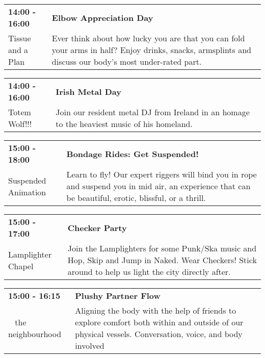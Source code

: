 \begin{tabular}{ p{1in} p{2.2in} }
    \textbf{14:00 - 16:00} & \textbf{Elbow Appreciation Day} \\
    Tissue and a Plan \newline  & Ever think about how lucky you are that you can fold your arms in half? Enjoy drinks, snacks, armsplints and discuss our body's most under-rated part. \\
    \hline 
\end{tabular}
    
\begin{tabular}{ p{1in} p{2.2in} }
    \textbf{14:00 - 16:00} & \textbf{Irish Metal Day} \\
    Totem Wolf!!! \newline  & Join our resident metal DJ from Ireland in an homage to the heaviest music of his homeland. \\
    \hline 
\end{tabular}
    
\begin{tabular}{ p{1in} p{2.2in} }
    \textbf{15:00 - 18:00} & \textbf{Bondage Rides: Get Suspended!} \\
    Suspended Animation \newline  & Learn to fly! Our expert riggers will bind you in rope and suspend you in mid air, an experience that can be beautiful, erotic, blissful, or a thrill. \\
    \hline 
\end{tabular}
    
\begin{tabular}{ p{1in} p{2.2in} }
    \textbf{15:00 - 17:00} & \textbf{Checker Party} \\
    Lamplighter Chapel \newline  & Join the Lamplighters for some Punk/Ska music and Hop, Skip and Jump in Naked. Wear Checkers! Stick around to help us light the city directly after. \\
    \hline 
\end{tabular}
    
\begin{tabular}{ p{1in} p{2.2in} }
    \textbf{15:00 - 16:15} & \textbf{Plushy Partner Flow} \\
    ~ \newline the neighbourhood & Aligning the body with the help of friends to explore comfort both within and outside of our physical vessels.  Conversation, voice, and body involved \\
    \hline 
\end{tabular}
    
